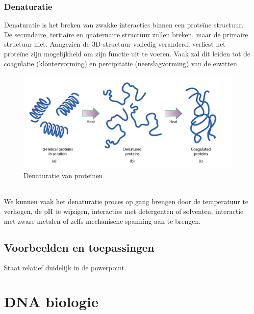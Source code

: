 \documentclass[a4paper,kul]{kulakarticle} %
\begin{document}
\subsubsection{Denaturatie} 
Denaturatie is het breken van zwakke interacties binnen een proteïne structuur. De secundaire, tertiaire en quaternaire structuur zullen breken, maar de primaire structuur niet. Aangezien de 3D-structuur volledig veranderd, verliest het proteïne zijn mogelijkheid om zijn functie uit te voeren. Vaak zal dit leiden tot de coagulatie (klontervorming) en percipitatie (neerslagvorming) van de eiwitten.
\begin{figure}[h]
	\centering
	\includegraphics[width=0.7\linewidth]{Denaturatie}
	\caption[Denaturatie]{Denaturatie van proteïnen}
	\label{fig:denaturatie}
\end{figure}\\
We kunnen vaak het denaturatie proces op gang brengen door de temperatuur te verhogen, de pH te wijzigen, interacties met detergenten of solventen, interactie met zware metalen of zelfs mechanische spanning aan te brengen. 
\subsection{Voorbeelden en toepassingen}
Staat relatief duidelijk in de powerpoint. 

\newpage
\section{DNA biologie}
\end{document}
